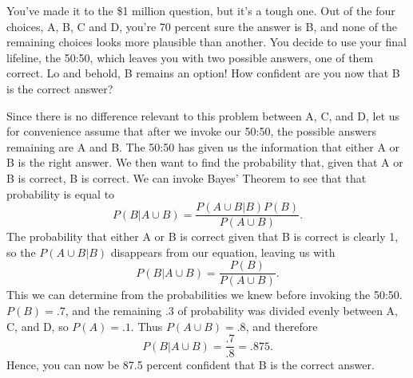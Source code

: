 \documentclass[12pt,letterpaper]{hmcpset}
\begin{document}
\begin{problem}
You've made it to the \$1 million question, but it's a tough one. 
Out of the four choices, A, B, C and D, you're 70 percent sure the answer is B, 
and none of the remaining choices looks more plausible than another. 
You decide to use your final lifeline, the 50:50, which leaves you with two possible answers, one of them correct.
Lo and behold, B remains an option! How confident are you now that B is the correct answer?	
\end{problem}

\begin{solution}
Since there is no difference relevant to this problem between A, C, and D, let us for convenience assume that after we
invoke our 50:50, the possible answers remaining are A and B. The 50:50 has given us the information that either A or
B is the right answer. We then want to find the probability that, given that A or B is correct, B is correct. We can
invoke Bayes' Theorem to see that that probability is equal to
$$P(B | A \cup B) = \frac{P(A \cup B | B)P(B)}{P(A \cup B)}.$$
The probability that either A or B is correct given that B is correct is clearly 1, so the $P(A \cup B | B)$ disappears
from our equation, leaving us with
$$P(B | A \cup B) = \frac{P(B)}{P(A \cup B)}.$$
This we can determine from the probabilities we knew before invoking the 50:50. $P(B) = .7$, and the remaining $.3$ of
probability was divided evenly between A, C, and D, so $P(A) = .1$. Thus $P(A \cup B) = .8$, and therefore
$$P(B | A \cup B) = \frac{.7}{.8} = .875.$$
Hence, you can now be 87.5 percent confident that B is the correct answer.
\vfill
\end{solution}
\newpage
\end{document}
